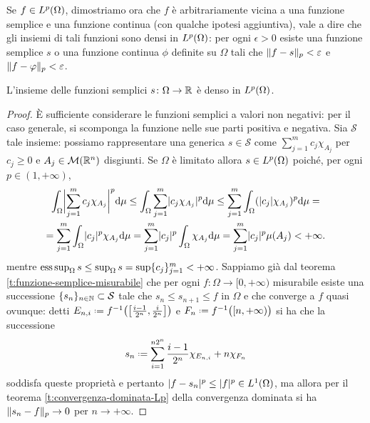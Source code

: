 Se $f\in\leb[p]{\Omega}$, dimostriamo ora che $f$ è arbitrariamente vicina a una funzione semplice e una funzione continua (con qualche ipotesi aggiuntiva), vale a dire che gli insiemi di tali funzioni sono densi in $\leb[p]{\Omega}$: per ogni $\epsilon>0$ esiste una funzione semplice $s$ o una funzione continua $\phi$ definite su $\Omega$ tali che $\norm{f-s}_p<\epsilon$ e $\norm{f-\phi}_p<\epsilon$.
\begin{teorema} \label{t:funzioni-semplici-dense}
    L'insieme delle funzioni semplici $s\colon\Omega\to\R$ è denso in $\leb[p]{\Omega}$.
\end{teorema}
\begin{proof}
    È sufficiente considerare le funzioni semplici a valori non negativi: per il caso generale, si scomponga la funzione nelle sue parti positiva e negativa.
    Sia $\mathcal{S}$ tale insieme: possiamo rappresentare una generica $s\in\mathcal{S}$ come $\sum_{j=1}^mc_j\chi_{A_j}$ per $c_j\ge 0$ e $A_j\in\mis(\R^n)$ disgiunti.
    Se $\Omega$ è limitato allora $s\in\leb[p]{\Omega}$ poich\'e, per ogni $p\in(1,+\infty)$,
    \begin{multline}
        \int_\Omega\abs[\bigg]{\sum_{j=1}^mc_j\chi_{A_j}}^p\dd\mu\le
        \int_\Omega\sum_{j=1}^m\abs{c_j\chi_{A_j}}^p\dd\mu\le
        \sum_{j=1}^m\int_\Omega(\abs{c_j}\chi_{A_j})^p\dd\mu=\\=
        \sum_{j=1}^m\int_\Omega\abs{c_j}^p\chi_{A_j}\dd\mu=
        \sum_{j=1}^m\abs{c_j}^p\int_\Omega\chi_{A_j}\dd\mu=
        \sum_{j=1}^m\abs{c_j}^p\mu(A_j)<
        +\infty.
    \end{multline}
    mentre $\esssup_\Omega s\le\sup_\Omega s=\sup\{c_j\}_{j=1}^m<+\infty$.
    Sappiamo già dal teorema \ref{t:funzione-semplice-misurabile} che per ogni $f\colon\Omega\to[0,+\infty)$ misurabile esiste una successione $\{s_n\}_{n\in\N}\subset\mathcal{S}$ tale che $s_n\le s_{n+1}\le f$ in $\Omega$ e che converge a $f$ quasi ovunque: detti $E_{n,i}\defeq f^{-1}\bigl(\bigl[\frac{i-1}{2^n},\frac{i}{2^n}\bigr]\bigr)$ e $F_n\defeq f^{-1}\bigl([n,+\infty)\bigr)$ si ha che la successione
        \begin{equation}
            s_n\defeq\sum_{i=1}^{n2^n}\frac{i-1}{2^n}\chi_{E_{n,i}}+n\chi_{F_n}
        \end{equation}
        soddisfa queste proprietà e pertanto $\abs{f-s_n}^p\le\abs{f}^p\in\leb[1]{\Omega}$, ma allora per il teorema \ref{t:convergenza-dominata-Lp} della convergenza dominata si ha $\norm{s_n-f}_p\to 0$ per $n\to+\infty$.
\end{proof}
